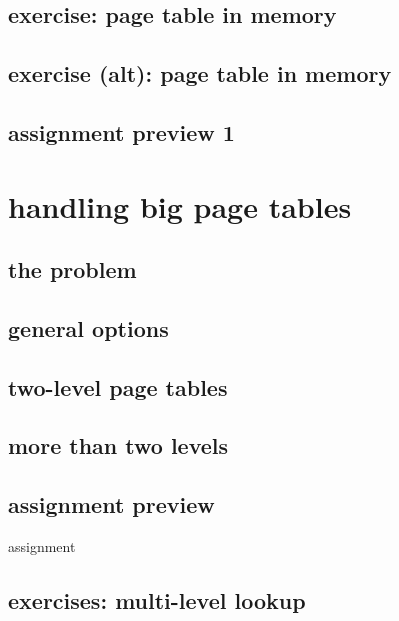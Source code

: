 \subsection{exercise: page table in memory}

\subsection{exercise (alt): page table in memory}


\subsection{assignment preview 1}





\section{handling big page tables}
\subsection{the problem}


\subsection{general options}


\subsection{two-level page tables}




\subsection{more than two levels}


\subsection{assignment preview}
\begin{frame}{assignment}
\end{frame}

\subsection{exercises: multi-level lookup}
